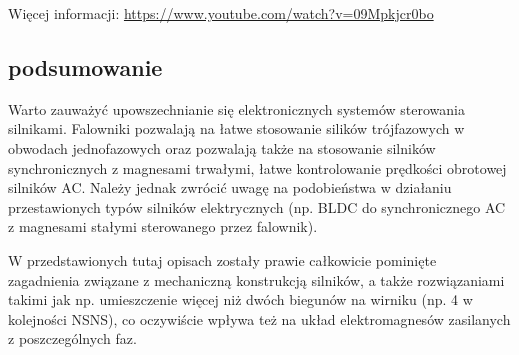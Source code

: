 \noindent Więcej informacji: \url{https://www.youtube.com/watch?v=09Mpkjcr0bo}

\subsection{podsumowanie}

Warto zauważyć upowszechnianie się elektronicznych systemów sterowania silnikami.
Falowniki pozwalają na łatwe stosowanie silików trójfazowych w obwodach jednofazowych oraz pozwalają także na stosowanie silników synchronicznych z magnesami trwałymi, łatwe kontrolowanie prędkości obrotowej silników AC.
Należy jednak zwrócić uwagę na podobieństwa w działaniu przestawionych typów silników elektrycznych (np. BLDC do synchronicznego AC z magnesami stałymi sterowanego przez falownik).

W przedstawionych tutaj opisach zostały prawie całkowicie pominięte zagadnienia związane z mechaniczną konstrukcją silników,
	a także rozwiązaniami takimi jak np. umieszczenie więcej niż dwóch biegunów na wirniku (np. 4 w kolejności NSNS), co oczywiście wpływa też na układ elektromagnesów zasilanych z poszczególnych faz.
